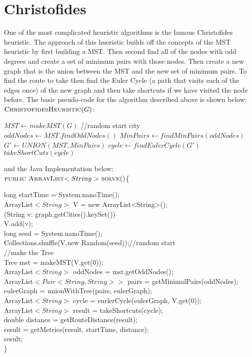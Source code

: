 \documentclass[midd]{thesis}
\newcommand{\tab}{\hspace*{2em}}
\begin{document}
\section{Christofides}
\tab One of the most complicated heuristic algorithms is the famous Christofides heuristic. The approach of this hueristic builds off the concepts of the MST heuristic by first building a MST. Then second find all of the nodes with odd degrees and create a set of minimum pairs with those nodes. Then create a new graph that is the union between the MST and the new set of minimum pairs. To find the route to take then find the Euler Cycle (a path that visits each of the edges once) of the new graph and then take shortcuts if we have visited the node before. The basic pseudo-code for the algorithm described above is shown below:\\
$\textnormal{\scshape ChristofidesHeuristic}(G)$:
\begin{codebox}
\li $MST \gets makeMST(G)$ //random start city
\li $oddNodes \gets MST.findOddNodes()$
\li $MinPairs \gets findMinPairs(oddNodes)$
\li $G' \gets UNION(MST,MinPairs)$
\li $cycle \gets findEulerCycle(G')$
\li\Return $takeShortCuts(cycle)$
\end{codebox}
and the Java Implementation below:\\
$\textnormal{\scshape public ArrayList$<String>$ solve}()$\{
\begin{codebox}
\tab long startTime = System.nanoTime();\\
\tab ArrayList$<String>$ V = new ArrayList<String>();\\
\tab \For(String v: graph.getCities().keySet()) \\
\tab\tab V.add(v);\\
\tab long seed = System.nanoTime();\\
\tab Collections.shuffle(V,new Random(seed));//random start\\
\tab //make the Tree\\
\tab Tree mst = makeMST(V.get(0));\\
\tab ArrayList$<String>$ oddNodes = mst.getOddNodes();\\
\tab ArrayList$<Pair<String,String>>$ pairs = getMinimalPairs(oddNodes);\\
\tab eulerGraph = unionWithTree(pairs, eulerGraph);\\
\tab ArrayList$<String>$ cycle =  eurlerCycle(eulerGraph, V.get(0));\\
\tab ArrayList$<String>$ result = takeShortcuts(cycle);\\
\tab double distance = getRouteDistance(result);\\
\tab result = getMetrics(result, startTime, distance);\\
\tab \Return result;\\
\}\\
\end{codebox}
\end{document}
